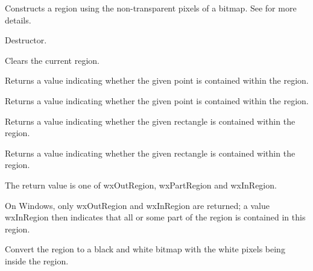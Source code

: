 

Constructs a region using the non-transparent pixels of a bitmap.  See
 for more details.


\label{wxregiondtor}


Destructor.

\label{wxregionclear}


Clears the current region.

\label{wxregioncontains}


Returns a value indicating whether the given point is contained within the region.


Returns a value indicating whether the given point is contained within the region.


Returns a value indicating whether the given rectangle is contained within the region.


Returns a value indicating whether the given rectangle is contained within the region.


The return value is one of wxOutRegion, wxPartRegion and wxInRegion.

On Windows, only wxOutRegion and wxInRegion are returned; a value wxInRegion then indicates that
all or some part of the region is contained in this region.

\label{wxregionconverttobitmap}


Convert the region to a black and white bitmap with the white pixels
being inside the region.


